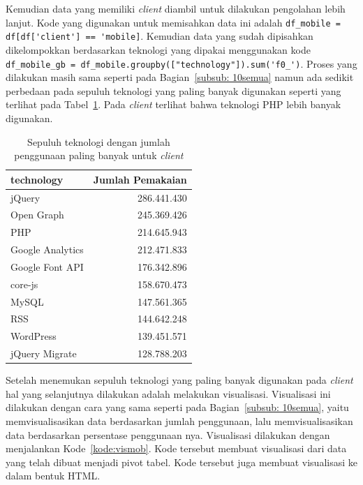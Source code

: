 Kemudian data yang memiliki \textit{client} \mobile diambil untuk dilakukan pengolahan lebih lanjut. Kode yang digunakan untuk memisahkan data ini adalah \verb|df_mobile = df[df['client'] == 'mobile]|. Kemudian data yang sudah dipisahkan dikelompokkan berdasarkan teknologi yang dipakai menggunakan kode \verb|df_mobile_gb = df_mobile.groupby(["technology"]).sum('f0_')|. Proses yang dilakukan masih sama seperti pada Bagian~\ref{subsub: 10semua} namun ada sedikit perbedaan pada sepuluh teknologi yang paling banyak digunakan seperti yang terlihat pada Tabel~\ref{tab:sepuluhmobile}. Pada \textit{client} \mobile terlihat bahwa teknologi PHP lebih banyak digunakan.
\begin{table}[H]
    \centering
    \caption{Sepuluh teknologi dengan jumlah penggunaan paling banyak untuk \textit{client} \mobile}
    \label{tab:sepuluhmobile}
    \begin{tabular}{|l|r|}
        \hline
        technology & Jumlah Pemakaian \\ \hline
        jQuery & 286.441.430 \\ \hline
        Open Graph & 245.369.426 \\ \hline
        PHP & 214.645.943 \\ \hline
        Google Analytics & 212.471.833 \\ \hline
        Google Font API & 176.342.896 \\ \hline
        core-js & 158.670.473 \\ \hline
        MySQL & 147.561.365 \\ \hline
        RSS & 144.642.248 \\ \hline
        WordPress & 139.451.571 \\ \hline
        jQuery Migrate & 128.788.203 \\ \hline
    \end{tabular}
\end{table}

Setelah menemukan sepuluh teknologi yang paling banyak digunakan pada \textit{client} \mobile hal yang selanjutnya dilakukan adalah melakukan visualisasi. Visualisasi ini dilakukan dengan cara yang sama seperti pada Bagian~\ref{subsub: 10semua}, yaitu memvisualisasikan data berdasarkan jumlah penggunaan, lalu  memvisualisasikan data berdasarkan persentase penggunaan nya. Visualisasi dilakukan dengan menjalankan Kode~\ref{kode:vismob}. Kode tersebut membuat visualisasi dari data yang telah dibuat menjadi pivot tabel. Kode tersebut juga membuat visualisasi ke dalam bentuk HTML.

